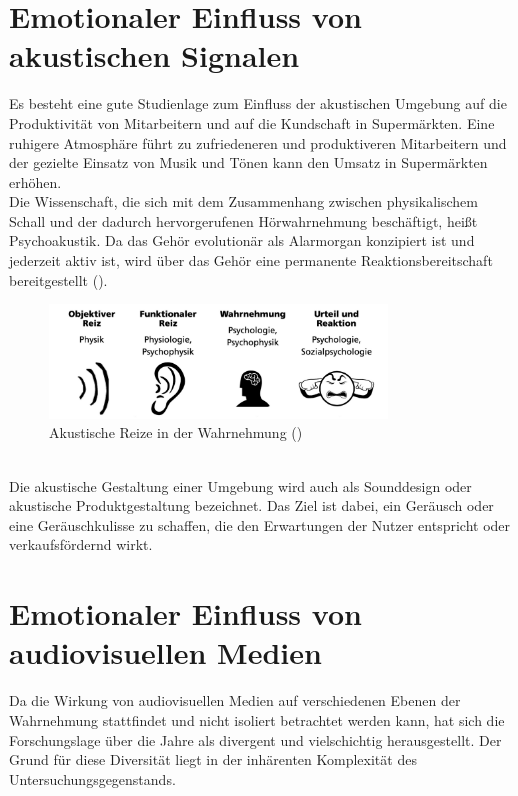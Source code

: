 \documentclass[./dokumentation.tex]{subfiles}
\begin{document}
\section{Emotionaler Einfluss von akustischen Signalen}
Es besteht eine gute Studienlage zum Einfluss der akustischen Umgebung auf die Produktivität von Mitarbeitern und auf die Kundschaft in Supermärkten. Eine ruhigere Atmosphäre führt zu zufriedeneren und produktiveren Mitarbeitern und der gezielte Einsatz von Musik und Tönen kann den Umsatz in Supermärkten erhöhen. \\
Die Wissenschaft, die sich mit dem Zusammenhang zwischen physikalischem Schall und der dadurch hervorgerufenen Hörwahrnehmung beschäftigt, heißt Psychoakustik. Da das Gehör evolutionär als Alarmorgan konzipiert ist und jederzeit aktiv ist, wird über das Gehör eine permanente Reaktionsbereitschaft bereitgestellt (\cite{fraunhofer}).\\

\begin{figure}[H]
    \centering
    \includegraphics[width=0.8\textwidth]{bilder/fraunhofer_akustik.png}
    \caption{Akustische Reize in der Wahrnehmung (\cite{fraunhofer})}
    \label{fig10:fraunhofer}
\end{figure}\\

Die akustische Gestaltung einer Umgebung wird auch als Sounddesign oder akustische Produktgestaltung bezeichnet. Das Ziel ist dabei, ein Geräusch oder eine Geräuschkulisse zu schaffen, die den Erwartungen der Nutzer entspricht oder verkaufsfördernd wirkt. \\

\section{Emotionaler Einfluss von audiovisuellen Medien} 
Da die Wirkung von audiovisuellen Medien auf verschiedenen Ebenen der Wahrnehmung stattfindet und nicht isoliert betrachtet werden kann, hat sich die Forschungslage über die Jahre als divergent und vielschichtig herausgestellt. Der Grund für diese Diversität liegt in der inhärenten Komplexität des Untersuchungsgegenstands. 
\end{document}
